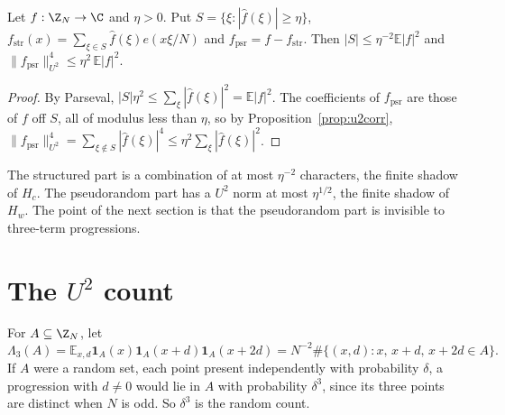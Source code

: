 \begin{proposition}\label{prop:strpsr}
Let $f:\Z_N\to\C$ and $\eta>0$. Put $S=\{\xi:|\hat f(\xi)|\ge\eta\}$, $f_{\mathrm{str}}(x)=\sum_{\xi\in S}\hat f(\xi)e(x\xi/N)$ and $f_{\mathrm{psr}}=f-f_{\mathrm{str}}$. Then $|S|\le\eta^{-2}\mathbb E|f|^2$ and $\|f_{\mathrm{psr}}\|_{U^2}^4\le\eta^2\,\mathbb E|f|^2$.
\end{proposition}
\begin{proof}
By Parseval, $|S|\eta^2\le\sum_\xi|\hat f(\xi)|^2=\mathbb E|f|^2$. The coefficients of $f_{\mathrm{psr}}$ are those of $f$ off $S$, all of modulus less than $\eta$, so by Proposition~\ref{prop:u2corr}, $\|f_{\mathrm{psr}}\|_{U^2}^4=\sum_{\xi\notin S}|\hat f(\xi)|^4\le\eta^2\sum_\xi|\hat f(\xi)|^2$.
\end{proof}

The structured part is a combination of at most $\eta^{-2}$ characters, the finite shadow of $H_c$. The pseudorandom part has a $U^2$ norm at most $\eta^{1/2}$, the finite shadow of $H_w$. The point of the next section is that the pseudorandom part is invisible to three-term progressions.

\section{The $U^2$ count}\label{sec:u2count}

For $A\subseteq\Z_N$, let
\[
\Lambda_3(A)=\mathbb E_{x,d}\mathbf 1_A(x)\mathbf 1_A(x+d)\mathbf 1_A(x+2d)=N^{-2}\#\{(x,d):x,\,x+d,\,x+2d\in A\}.
\]
If $A$ were a random set, each point present independently with probability $\delta$, a progression with $d\ne0$ would lie in $A$ with probability $\delta^3$, since its three points are distinct when $N$ is odd. So $\delta^3$ is the random count.

